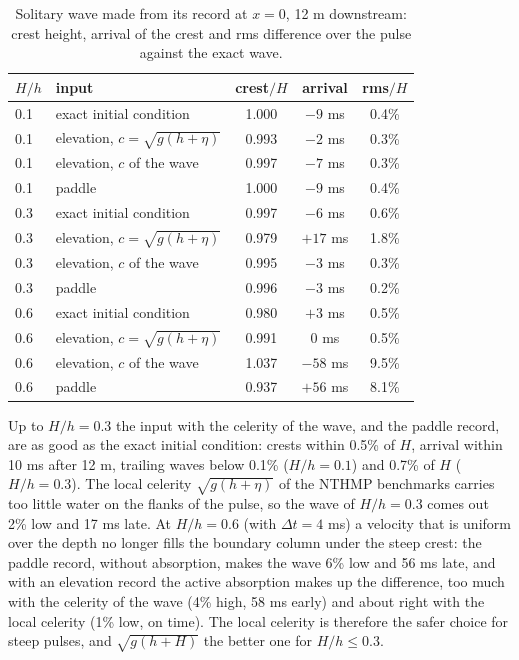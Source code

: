\begin{table}[!htbp]
\centering
\caption{Solitary wave made from its record at $x = 0$, 12 m downstream:
crest height, arrival of the crest and rms difference over the pulse
against the exact wave.}
\label{tab:ts}
\small
\begin{tabular}{llccc}
\toprule
$H/h$ & input & crest$/H$ & arrival & rms$/H$ \\
\midrule
0.1 & exact initial condition & 1.000 & $-9$ ms & 0.4\% \\
0.1 & elevation, $c = \sqrt{g(h+\eta)}$ & 0.993 & $-2$ ms & 0.3\% \\
0.1 & elevation, $c$ of the wave & 0.997 & $-7$ ms & 0.3\% \\
0.1 & paddle & 1.000 & $-9$ ms & 0.4\% \\
\midrule
0.3 & exact initial condition & 0.997 & $-6$ ms & 0.6\% \\
0.3 & elevation, $c = \sqrt{g(h+\eta)}$ & 0.979 & $+17$ ms & 1.8\% \\
0.3 & elevation, $c$ of the wave & 0.995 & $-3$ ms & 0.3\% \\
0.3 & paddle & 0.996 & $-3$ ms & 0.2\% \\
\midrule
0.6 & exact initial condition & 0.980 & $+3$ ms & 0.5\% \\
0.6 & elevation, $c = \sqrt{g(h+\eta)}$ & 0.991 & 0 ms & 0.5\% \\
0.6 & elevation, $c$ of the wave & 1.037 & $-58$ ms & 9.5\% \\
0.6 & paddle & 0.937 & $+56$ ms & 8.1\% \\
\bottomrule
\end{tabular}
\end{table}

Up to $H/h = 0.3$ the input with the celerity of the wave, and the paddle
record, are as good as the exact initial condition: crests within 0.5\% of
$H$, arrival within 10 ms after 12 m, trailing waves below 0.1\%
($H/h = 0.1$) and 0.7\% of $H$ ($H/h = 0.3$). The local celerity
$\sqrt{g(h+\eta)}$ of the NTHMP benchmarks carries too little water on the
flanks of the pulse, so the wave of $H/h = 0.3$ comes out 2\% low and 17 ms
late. At $H/h = 0.6$ (with $\Delta t = 4$ ms) a velocity that is uniform
over the depth no longer fills the boundary column under the steep crest:
the paddle record, without absorption, makes the wave 6\% low and 56 ms
late, and with an elevation record the active absorption makes up the
difference, too much with the celerity of the wave (4\% high, 58 ms early)
and about right with the local celerity (1\% low, on time). The local
celerity is therefore the safer choice for steep pulses, and
$\sqrt{g(h+H)}$ the better one for $H/h \le 0.3$.

